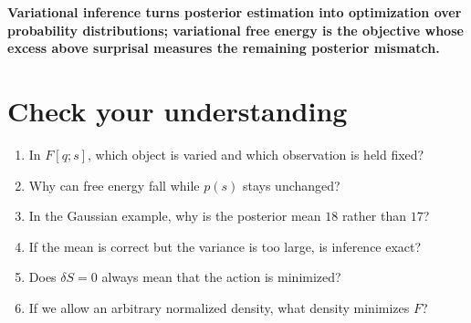\documentclass[
  letterpaper,
  DIV=11,
  numbers=noendperiod]{scrreprt}
\providecommand{\tightlist}{%
  \setlength{\itemsep}{0pt}\setlength{\parskip}{0pt}}
\begin{document}
\begin{tcolorbox}[enhanced jigsaw, arc=.35mm, bottomrule=.15mm, bottomtitle=1mm, breakable, colback=white, colbacktitle=quarto-callout-tip-color!10!white, colframe=quarto-callout-tip-color-frame, coltitle=black, left=2mm, leftrule=.75mm, opacityback=0, opacitybacktitle=0.6, rightrule=.15mm, title=\textcolor{quarto-callout-tip-color}{\faLightbulb}\hspace{0.5em}{Explain it in one sentence}, titlerule=0mm, toprule=.15mm, toptitle=1mm]

\textbf{Variational inference turns posterior estimation into
optimization over probability distributions; variational free energy is
the objective whose excess above surprisal measures the remaining
posterior mismatch.}

\end{tcolorbox}

\section*{Check your understanding}\label{check-your-understanding}


\begin{enumerate}
\def\labelenumi{\arabic{enumi}.}
\tightlist
\item
  In \(F[q;s]\), which object is varied and which observation is held
  fixed?
\item
  Why can free energy fall while \(p(s)\) stays unchanged?
\item
  In the Gaussian example, why is the posterior mean \(18\) rather than
  \(17\)?
\item
  If the mean is correct but the variance is too large, is inference
  exact?
\item
  Does \(\delta S=0\) always mean that the action is minimized?
\item
  If we allow an arbitrary normalized density, what density minimizes
  \(F\)?
\end{enumerate}
\end{document}
